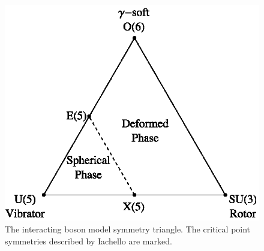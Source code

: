 \begin{figure}[t]
    \centering
    \includegraphics[scale=1]{Discussion/CastenTriangle.eps}
    \caption{The interacting boson model symmetry triangle. The critical point symmetries described by Iachello\citep{iachello00:_x5} are marked.}
    \label{fig:castentriangle}
\end{figure}
